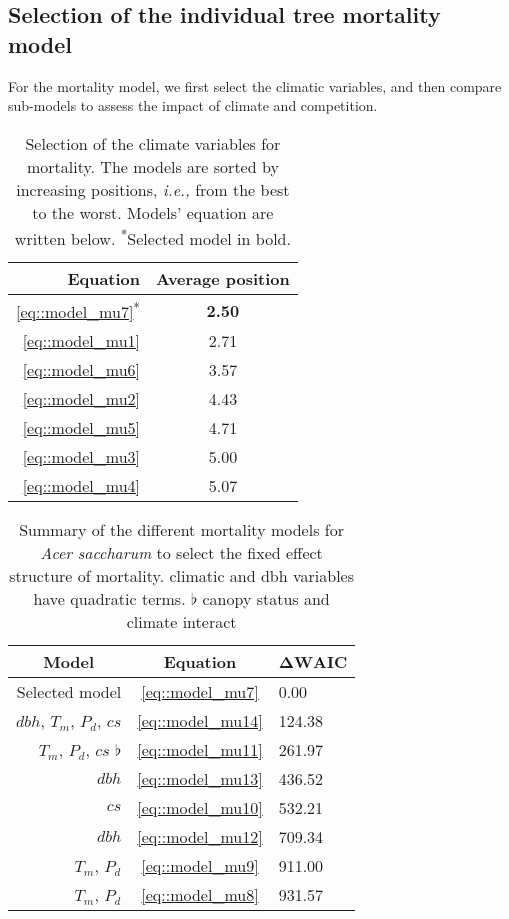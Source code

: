 \documentclass[letterpaper, 12pt]{article}
\newcommand {\ie}{\textit{i.e., }}
\theoremstyle{theo}
\begin{document}
\begin{refsection}
\begin{onehalfspace}
\subsection{Selection of the individual tree mortality model}
For the mortality model, we first select the climatic variables, and then compare sub-models to assess the impact of climate and competition.

\begin{table}[h!]
\centering
\caption[Selection of the climate variables for mortality]{Selection of the climate variables for mortality. The models are sorted by increasing positions, \ie from the best to the worst. Models' equation are written below. \textsuperscript{*}Selected model in bold.}
\label{tab::climSelection_mu}
\begin{tabular}{@{}rc@{}}
	\toprule
	\textbf{Equation} & \textbf{Average position} \\
	\midrule
		\ref{eq::model_mu7}\textsuperscript{*} & \textbf{2.50} \\
		\ref{eq::model_mu1} & 2.71 \\
		\ref{eq::model_mu6} & 3.57 \\
		\ref{eq::model_mu2} & 4.43 \\
		\ref{eq::model_mu5} & 4.71 \\
		\ref{eq::model_mu3} & 5.00 \\
		\ref{eq::model_mu4} & 5.07 \\
	\bottomrule
\end{tabular}
\end{table}

\begin{table}
	\centering
	\caption[Summary for \textit{Acer saccharum} (mortality)]{Summary of the different mortality models for \textit{Acer saccharum} to select the fixed effect structure of mortality. \dag climatic and dbh variables have quadratic terms. $ \flat $ canopy status and climate interact}
	\label{tab::acsa_fixeff_mu}
	\begin{tabular}{@{}rcl@{}}
	\toprule
	\multicolumn{1}{c}{\textbf{Model}} & \multicolumn{1}{c}{\textbf{Equation}} & \multicolumn{1}{c}{$ \bm{\Delta \text{WAIC}} $} \\
	\midrule
		Selected model & \ref{eq::model_mu7} & 0.00 \\
		$ dbh $, $ T_m $, $ P_d $, $ cs $ \dag & \ref{eq::model_mu14} & 124.38 \\
		$ T_m $, $ P_d $, $ cs $ \dag $ \flat $ & \ref{eq::model_mu11} & 261.97 \\
		$ dbh $ \dag & \ref{eq::model_mu13} & 436.52 \\
		$ cs $ & \ref{eq::model_mu10} & 532.21 \\
		$ dbh $ & \ref{eq::model_mu12} & 709.34 \\
		$ T_m $, $ P_d $ \dag & \ref{eq::model_mu9} & 911.00 \\
		$ T_m $, $ P_d $ & \ref{eq::model_mu8} & 931.57 \\
   \bottomrule
	\end{tabular}
\end{table}


\end{onehalfspace}
\end{refsection}
\end{document}
